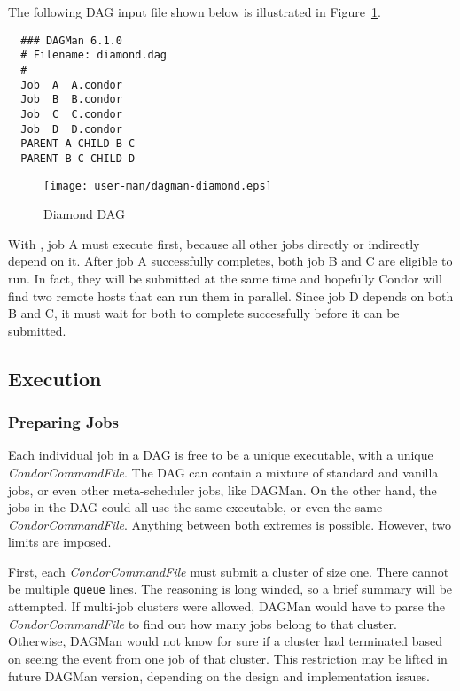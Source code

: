 The following  DAG input file shown below is illustrated in
Figure~\ref{fig:dagman-diamond}.

\begin{verbatim}
  ### DAGMan 6.1.0
  # Filename: diamond.dag
  #
  Job  A  A.condor 
  Job  B  B.condor 
  Job  C  C.condor	
  Job  D  D.condor
  PARENT A CHILD B C
  PARENT B C CHILD D
\end{verbatim}

\begin{figure}[hbt]
\centering
\texttt{[image: user-man/dagman-diamond.eps]}
\caption{\label{fig:dagman-diamond}Diamond DAG}
\end{figure}

With , job A must execute first, because all other jobs
directly or indirectly depend on it.  After job A successfully completes, both
job B and C are eligible to run.  In fact, they will be submitted at the same
time and hopefully Condor will find two remote hosts that can run them in
parallel.  Since job D depends on both B and C, it must wait for both to
complete successfully before it can be submitted.

\subsection{Execution}

\subsubsection{Preparing Jobs}
\label{dagman:prepjob}

Each individual job in a DAG is free to be a unique executable, with a unique
\textit{CondorCommandFile}.  The DAG can contain a mixture of standard and
vanilla jobs, or even other meta-scheduler jobs, like DAGMan.  On the other
hand, the jobs in the DAG could all use the same executable, or even the same
\textit{CondorCommandFile}.  Anything between both extremes is possible.
However, two limits are imposed.

First, each \textit{CondorCommandFile} must submit a cluster of size one.
There cannot be multiple \texttt{queue} lines.  The reasoning is long winded,
so a brief summary will be attempted.  If multi-job clusters were allowed,
DAGMan would have to parse the \textit{CondorCommandFile} to find out how many
jobs belong to that cluster.  Otherwise, DAGMan would not know for sure if a
cluster had terminated based on seeing the event from one job of that
cluster.  This restriction may be lifted in future DAGMan version, depending
on the design and implementation issues.

